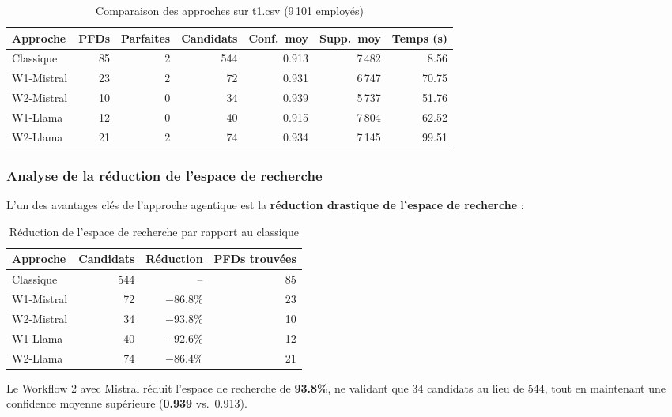 \documentclass[12pt,a4paper]{article}
\begin{document}
\begin{table}[H]
\centering
\caption{Comparaison des approches sur t1.csv (9\,101 employ\'{e}s)}
\label{tab:comparison}
\small
\begin{tabular}{@{}lrrrrrr@{}}
\toprule
\textbf{Approche} & \textbf{PFDs} & \textbf{Parfaites} & \textbf{Candidats} & \textbf{Conf.\ moy} & \textbf{Supp.\ moy} & \textbf{Temps (s)} \\
\midrule
Classique & 85 & 2 & 544 & 0.913 & 7\,482 & 8.56 \\
W1-Mistral & 23 & 2 & 72 & 0.931 & 6\,747 & 70.75 \\
W2-Mistral & 10 & 0 & 34 & 0.939 & 5\,737 & 51.76 \\
W1-Llama & 12 & 0 & 40 & 0.915 & 7\,804 & 62.52 \\
W2-Llama & 21 & 2 & 74 & 0.934 & 7\,145 & 99.51 \\
\bottomrule
\end{tabular}
\end{table}

\subsubsection{Analyse de la r\'{e}duction de l'espace de recherche}

L'un des avantages cl\'{e}s de l'approche agentique est la \textbf{r\'{e}duction drastique de l'espace de recherche} :

\begin{table}[H]
\centering
\caption{R\'{e}duction de l'espace de recherche par rapport au classique}
\label{tab:reduction}
\begin{tabular}{@{}lrrr@{}}
\toprule
\textbf{Approche} & \textbf{Candidats} & \textbf{R\'{e}duction} & \textbf{PFDs trouv\'{e}es} \\
\midrule
Classique & 544 & -- & 85 \\
W1-Mistral & 72 & $-86.8\%$ & 23 \\
W2-Mistral & 34 & $-93.8\%$ & 10 \\
W1-Llama & 40 & $-92.6\%$ & 12 \\
W2-Llama & 74 & $-86.4\%$ & 21 \\
\bottomrule
\end{tabular}
\end{table}

Le Workflow 2 avec Mistral r\'{e}duit l'espace de recherche de \textbf{93.8\%}, ne validant que 34 candidats au lieu de 544, tout en maintenant une confidence moyenne sup\'{e}rieure (\textbf{0.939} vs.\ 0.913).
\end{document}
